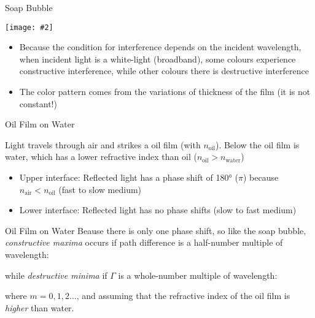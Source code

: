 \documentclass[12pt,compress,aspectratio=169]{beamer}
\newcommand{\pic}[2]{\texttt{[image: \#2]}}
\newcommand{\eq}[2]{\vspace{#1}{\LARGE\begin{displaymath}#2\end{displaymath}}}
\begin{document}
\begin{frame}{Soap Bubble}
  \begin{center}
    \pic{.45}{soap-bubble.jpg}
  \end{center}
  \begin{itemize}
  \item Because the condition for interference depends on the incident
    wavelength, when incident light is a white-light (broadband), some colours
    experience constructive interference, while other colours there is
    destructive interference
  \item The color pattern comes from the variations of thickness of the film
    (it is not constant!)
  \end{itemize}
\end{frame}



\begin{frame}{Oil Film on Water}
  \begin{center}
  \end{center}
  Light travels through air and strikes a oil film (with
  $n_\mathrm{oil}$). Below the oil film is water, which has a lower refractive
  index than oil ($n_\mathrm{oil}>n_\mathrm{water}$)
  \begin{itemize}
  \item Upper interface: Reflected light has a phase shift of \ang{180} ($\pi$)
    because $n_\mathrm{air}<n_\mathrm{oil}$ (fast to slow medium)
  \item Lower interface: Reflected light has no phase shifts (slow to fast
    medium)
  \end{itemize}
\end{frame}



\begin{frame}{Oil Film on Water}
  Beause there is only one phase shift, so like the soap bubble,
  \emph{constructive maxima} occurs if path difference is a half-number
  multiple of wavelength:

  \eq{-.22in}{
    \boxed{
      \frac{2n_\mathrm{oil}t}{\lambda}=m+\frac12
    }
  }

  while \emph{destructive minima} if $\Gamma$ is a whole-number multiple of
  wavelength:

  \eq{-.22in}{
    \boxed{
      \frac{2n_\mathrm{oil}t}{\lambda}=m
    }
  }

  where $m=0,1,2\ldots$, and assuming that the refractive index of the oil
  film is \emph{higher} than water.
\end{frame}
\end{document}
